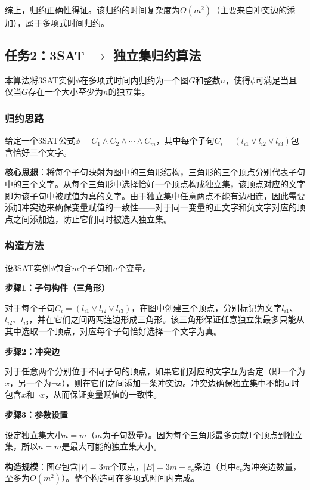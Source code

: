 \documentclass{sysucseexp}
\begin{document}
综上，归约正确性得证。该归约的时间复杂度为$O(m^2)$（主要来自冲突边的添加），属于多项式时间归约。

\subsection{任务2：3SAT $\to$ 独立集归约算法}

本算法将3SAT实例$\phi$在多项式时间内归约为一个图$G$和整数$n$，使得$\phi$可满足当且仅当$G$存在一个大小至少为$n$的独立集。

\subsubsection{归约思路}

给定一个3SAT公式$\phi = C_1 \land C_2 \land \cdots \land C_m$，其中每个子句$C_i = (l_{i1} \lor l_{i2} \lor l_{i3})$包含恰好三个文字。

\textbf{核心思想}：将每个子句映射为图中的三角形结构，三角形的三个顶点分别代表子句中的三个文字。从每个三角形中选择恰好一个顶点构成独立集，该顶点对应的文字即为该子句中被赋值为真的文字。由于独立集中任意两点不能有边相连，因此需要添加冲突边来确保变量赋值的一致性——对于同一变量的正文字和负文字对应的顶点之间添加边，防止它们同时被选入独立集。

\subsubsection{构造方法}

设3SAT实例$\phi$包含$m$个子句和$n$个变量。

\textbf{步骤1：子句构件（三角形）}

对于每个子句$C_i = (l_{i1} \lor l_{i2} \lor l_{i3})$，在图中创建三个顶点，分别标记为文字$l_{i1}$、$l_{i2}$、$l_{i3}$，并在它们之间两两连边形成三角形。该三角形保证任意独立集最多只能从其中选取一个顶点，对应每个子句恰好选择一个文字为真。

\textbf{步骤2：冲突边}

对于任意两个分别位于不同子句的顶点，如果它们对应的文字互为否定（即一个为$x$，另一个为$\neg x$），则在它们之间添加一条冲突边。冲突边确保独立集中不能同时包含$x$和$\neg x$，从而保证变量赋值的一致性。

\textbf{步骤3：参数设置}

设定独立集大小$n = m$（$m$为子句数量）。因为每个三角形最多贡献1个顶点到独立集，所以$n = m$是最大可能的独立集大小。

\textbf{构造规模}：图$G$包含$|V| = 3m$个顶点，$|E| = 3m + e_c$条边（其中$e_c$为冲突边数量，至多为$O(m^2)$）。整个构造可在多项式时间内完成。
\end{document}
